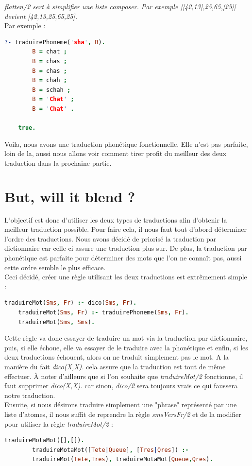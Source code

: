 \documentclass[11pt]{report}
\begin{document}
	{\em flatten/2 sert à simplifier une liste composer. Par exemple [[42,13],25,65,[25]] devient [42,13,25,65,25].}\\
	
	Par exemple :
	\begin{lstlisting}[language=Prolog]
	?- traduirePhoneme('sha', B).
		B = chat ;
		B = chas ;
		B = chas ;
		B = chah ;
		B = schah ;
		B = 'Chat' ;
		B = 'Chat' .
		
	true.
	\end{lstlisting}
	
	Voila, nous avons une traduction phonétique fonctionnelle. Elle n'est pas parfaite, loin de la, aussi nous allons voir comment tirer profit du meilleur des deux traduction dans la prochaine partie.
	
	\section{But, will it blend ?}
	
	L'objectif est donc d'utiliser les deux types de traductions afin d'obtenir la meilleur traduction possible. Pour faire cela, il nous faut tout d'abord déterminer l'ordre des traductions. Nous avons décidé de priorisé la traduction par dictionnaire car celle-ci assure une traduction plus sur. De plus, la traduction par phonétique est parfaite pour déterminer des mots que l'on ne connaît pas, aussi cette ordre semble le plus efficace.\\
	Ceci décidé, créer une règle utilisant les deux traductions est extrêmement simple :
	\begin{lstlisting}[language=Prolog]
	traduireMot(Sms, Fr) :- dico(Sms, Fr).
	traduireMot(Sms, Fr) :- traduirePhoneme(Sms, Fr).
	traduireMot(Sms, Sms).
	\end{lstlisting}
	
	Cette règle va donc essayer de traduire un mot via la traduction par dictionnaire, puis, si elle échoue, elle va essayer de le traduire avec la phonétique et enfin, si les deux traductions échouent, alors on ne traduit simplement pas le mot. A la manière du fait {\em dico(X,X).} cela assure que la traduction est tout de même effectuer. À noter d'ailleurs que si l'on souhaite que {\em traduireMot/2} fonctionne, il faut supprimer {\em dico(X,X).} car sinon, {\em dico/2} sera toujours vrais ce qui faussera notre traduction.\\
	
	Ensuite, si nous désirons traduire simplement une "phrase" représenté par une liste d'atomes, il nous suffit de reprendre la règle {\em smsVersFr/2} et de la modifier pour utiliser la règle {\em traduireMot/2} :
	\begin{lstlisting}[language=Prolog]
	traduireMotaMot([],[]).
		traduireMotaMot([Tete|Queue], [Tres|Qres]) :-
		traduireMot(Tete,Tres), traduireMotaMot(Queue,Qres).
	\end{lstlisting}
	
\end{document}
